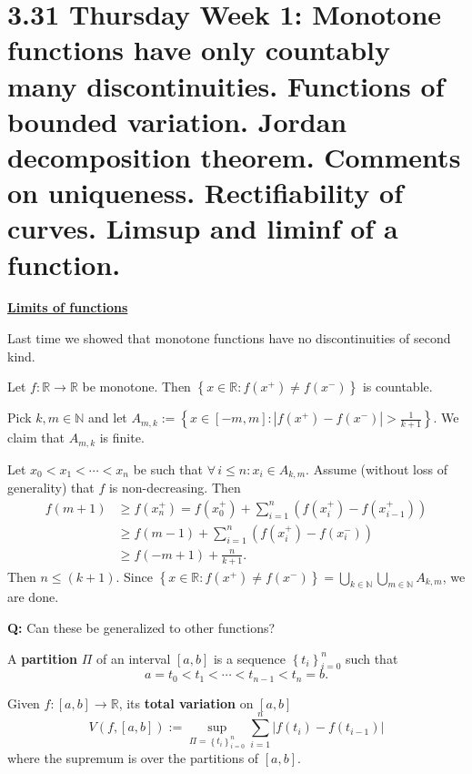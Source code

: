 \documentclass{notes}
\begin{document}
\newpage

\section{3.31 Thursday Week 1: Monotone functions have only countably many discontinuities. Functions of bounded variation. Jordan decomposition theorem. Comments on uniqueness. Rectifiability of curves. Limsup and liminf of a function.}

\underline{\boldmath \bfseries Limits of functions}

Last time we showed that monotone functions have no discontinuities of second kind.

\begin{lem}
  Let $f \colon \mathbb R \to \mathbb R$ be monotone.
  Then $\left \{ x \in \mathbb R : f(x^+) \neq f(x^-) \right \}$ is countable.
\end{lem}

\begin{prf}
  Pick $k, m \in \mathbb N$ and let $A_{m, k} := \left \{ x \in [-m, m] : \left | f(x^+) - f(x^-) \right | > \frac{1}{k + 1} \right \}$.
  We claim that $A_{m, k}$ is finite.
  
  Let $x_{0} < x_{1} < \cdots < x_n$ be such that $\forall \, i \leq n: x_i \in A_{k, m}$.
  Assume (without loss of generality) that $f$ is non-decreasing.
  Then 
  \begin{align}
    f(m + 1) &\geq f(x_n^+) = f(x_0^+) + \sum_{i = 1}^n \left ( f(x_i^+) - f(x_{i - 1}^+) \right ) \nonumber \\ 
    &\geq f(m - 1) + \sum_{i = 1}^n \left ( f(x_i^+) - f(x_i^-) \right ) \nonumber \\ 
    &\geq f(-m + 1) + \frac{n}{k + 1}.
  \end{align}
  Then $n \leq (k + 1)$.
  Since $\left \{ x \in \mathbb R : f(x^+) \neq f(x^-) \right \} = \bigcup_{k \in \mathbb N} \bigcup_{m \in \mathbb N} A_{k, m}$, we are done.
\end{prf}

{\boldmath \bfseries  Q:} Can these be generalized to other functions?

\begin{defn}
  A {\boldmath \bfseries partition} $\Pi$ of an interval $[a, b]$ is a sequence $\left \{ t_i \right \}_{i = 0}^n$ such that 
  \[
    a = t_0 < t_{1} < \cdots < t_{n - 1} < t_n = b.
  \]
\end{defn}

\begin{defn}
  Given $f \colon [a, b] \to \mathbb R$, its {\boldmath \bfseries total variation} on $[a, b]$
  \[
    V(f, [a, b]) := \sup_{\Pi = \left \{ t_i \right \}_{i = 0}^n} \sum_{i = 1}^n \left | f(t_i) - f(t_{i - 1}) \right | 
  \]
  where the supremum is over the partitions of $[a, b]$.
\end{defn}
\end{document}
